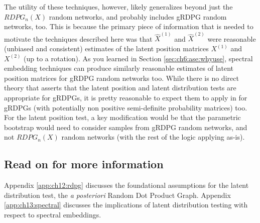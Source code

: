 The utility of these techniques, however, likely generalizes beyond just the $RDPG_n(X)$ random networks, and probably includes gRDPG random networks, too. This is because the primary piece of information that is needed to motivate the techniques described here was that $\hat X^{(1)}$ and $\hat X^{(2)}$ were reasonable (unbiased and consistent) estimates of the latent position matrices $X^{(1)}$ and $X^{(2)}$ (up to a rotation). As you learned in Section \ref{sec:ch6:ase:whyuse}, spectral embedding techniques can produce similarly reasonable estimates of latent position matrices for gRDPG random networks too. While there is no direct theory that asserts that the latent position and latent distribution tests are appropriate for gRDPGs, it is pretty reasonable to expect them to apply in for gRDPGs (with potentially non positive semi-definite probability matrices) too. For the latent position test, a key modification would be that the parametric bootstrap would need to consider samples from gRDPG random networks, and not $RDPG_n(X)$ random networks (with the rest of the logic applying as-is).

\subsection{Read on for more information}

Appendix \ref{app:ch12:rdpg} discusses the foundational assumptions for the latent distribution test, the \textit{a posteriori} Random Dot Product Graph. Appendix \ref{app:ch13:spectral} discusses the implications of latent distribution testing with respect to spectral embeddings.

\newpage